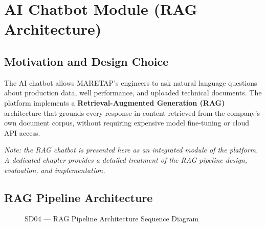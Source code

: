 \section{AI Chatbot Module (RAG Architecture)}
\begin{sloppypar}

\subsection{Motivation and Design Choice}

The AI chatbot allows MARETAP's engineers to ask natural language questions about
production data, well performance, and uploaded technical documents. The platform
implements a \textbf{Retrieval-Augmented Generation (RAG)} architecture that
grounds every response in content retrieved from the company's own document
corpus, without requiring expensive model fine-tuning or cloud API access.

\noindent\textit{Note: the RAG chatbot is presented here as an integrated module
of the platform. A dedicated chapter provides a detailed treatment of the RAG
pipeline design, evaluation, and implementation.}

\subsection{RAG Pipeline Architecture}

\begin{figure}[H]
  \centering
  \caption{SD04 --- RAG Pipeline Architecture Sequence Diagram}
  \label{fig:sd04_rag}
\end{figure}


\end{sloppypar}
